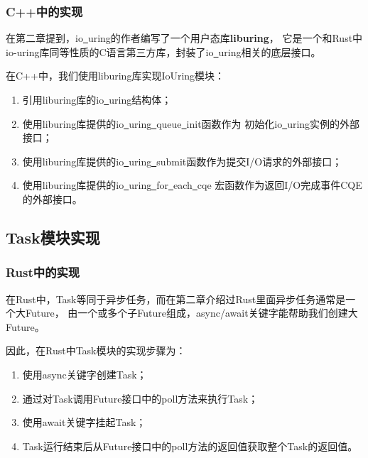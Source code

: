 \documentclass[supercite]{HustGraduPaper}
\theoremstyle{definition}
\begin{document}
\subsubsection{C++中的实现}

在第二章提到，io\underline{~}uring的作者编写了一个用户态库\textbf{liburing}，
它是一个和Rust中io-uring库同等性质的C语言第三方库，封装了io\underline{~}uring相关的底层接口。\par

在C++中，我们使用liburing库实现IoUring模块：

\begin{enumerate}
  \item 引用liburing库的io\underline{~}uring结构体；
  \item 使用liburing库提供的io\underline{~}uring\underline{~}queue\underline{~}init函数作为
    初始化io\underline{~}uring实例的外部接口；
  \item 使用liburing库提供的io\underline{~}uring\underline{~}submit函数作为提交I/O请求的外部接口；
  \item 使用liburing库提供的io\underline{~}uring\underline{~}for\underline{~}each\underline{~}cqe
    宏函数作为返回I/O完成事件CQE的外部接口。
\end{enumerate}

\subsection{Task模块实现}

\subsubsection{Rust中的实现}

在Rust中，Task等同于异步任务，而在第二章介绍过Rust里面异步任务通常是一个大Future，
由一个或多个子Future组成，async/await关键字能帮助我们创建大Future。\par

因此，在Rust中Task模块的实现步骤为：

\begin{enumerate}
  \item 使用async关键字创建Task；
  \item 通过对Task调用Future接口中的poll方法来执行Task；
  \item 使用await关键字挂起Task；
  \item Task运行结束后从Future接口中的poll方法的返回值获取整个Task的返回值。
\end{enumerate}
\end{document}
